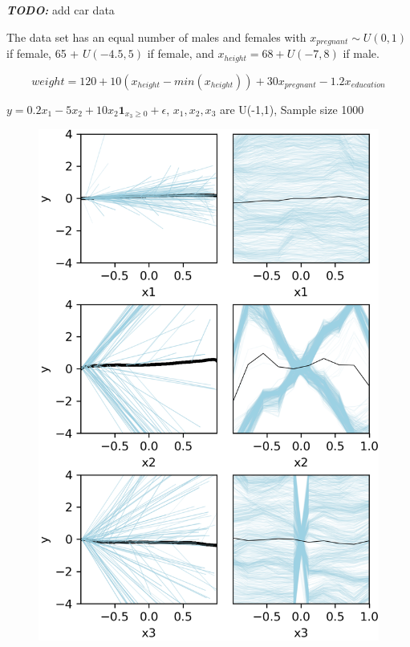 \documentclass[12pt]{article}
\newcommand{\todo}[1]{{\bf\em TODO:} {{#1}}}
\begin{document}
\todo{add car data}

The data set has an equal number of males and females with $x_{pregnant} \sim U(0,1)$ if female, 65 + $U(-4.5,5)$ if female, and $x_{height} = 68 + U(-7,8)$ if male. 

\[
weight = 120 + 10(x_{height} - min(x_{height})) + 30x_{pregnant} - 1.2x_{education}
\]

$y = 0.2x_1 - 5x_2 + 10x_2\mathbf{1}_{x_3 \geq 0} + \epsilon$, $x_1, x_2, x_3$ are U(-1,1), Sample size 1000

\begin{figure}[htbp]
\begin{center}
\includegraphics[scale=0.8]{images/bigx.png}

\end{center}
\end{figure}
\end{document}
